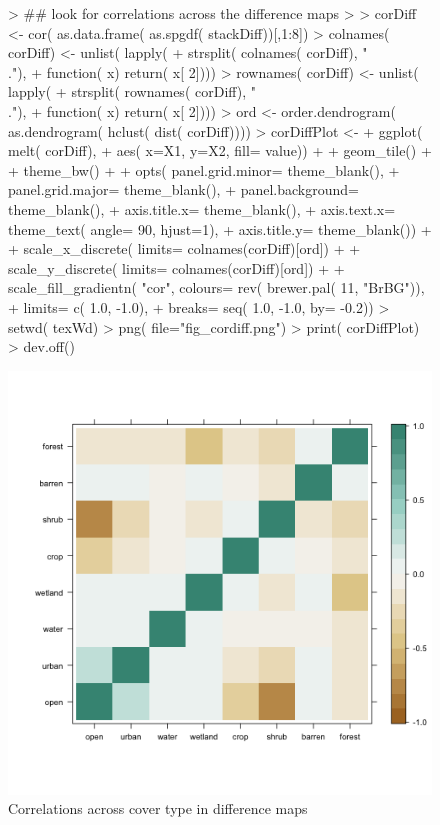\begin{figure} 
\begin{center} 

\begin{Schunk}
\begin{Sinput}
> ## look for correlations across the difference maps
> 
> corDiff <- cor( as.data.frame( as.spgdf( stackDiff))[,1:8])
> colnames( corDiff) <- unlist( lapply( 
+     strsplit( colnames( corDiff), "\\."), 
+     function( x) return( x[ 2])))
> rownames( corDiff) <- unlist( lapply( 
+     strsplit( rownames( corDiff), "\\."), 
+     function( x) return( x[ 2])))
> ord <- order.dendrogram( as.dendrogram( hclust( dist( corDiff))))
> corDiffPlot <- 
+   ggplot( melt( corDiff),
+          aes( x=X1, y=X2, fill= value)) +
+   geom_tile() +
+   theme_bw() +
+   opts( panel.grid.minor= theme_blank(),
+        panel.grid.major= theme_blank(),
+        panel.background= theme_blank(),
+        axis.title.x= theme_blank(),
+        axis.text.x= theme_text( angle= 90, hjust=1),
+        axis.title.y= theme_blank()) +
+   scale_x_discrete( limits= colnames(corDiff)[ord]) +
+   scale_y_discrete( limits= colnames(corDiff)[ord]) +
+   scale_fill_gradientn( "cor", colours= rev( brewer.pal( 11, "BrBG")), 
+                          limits= c( 1.0, -1.0),
+                          breaks= seq( 1.0, -1.0, by= -0.2))
> setwd( texWd)
> png( file="fig_cordiff.png")
> print( corDiffPlot)
> dev.off()
\end{Sinput}
\end{Schunk}
\includegraphics{fig_cordiff}
\end{center} 
\caption{Correlations across cover type in difference maps} 
\label{fig:cordiff} 
\end{figure} 


